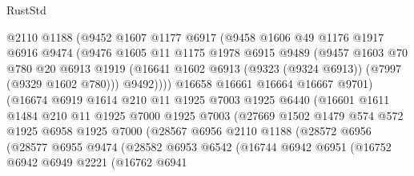 \begin{lexlean}{RustStd}
\begin{coremodule}
                    @2110
                    @1188
                    (@9452
                      @1607
                      @1177
                      @6917
                      (@9458
                        @1606
                        @49
                        @1176
                        @1917
                        @6916
                        @9474
                        (@9476
                          @1605
                          @11
                          @1175
                          @1978
                          @6915
                          @9489
                          (@9457
                            @1603
                            @70
                            @780
                            @20
                            @6913
                            @1919
                            (@16641 @1602 @6913 (@9323 (@9324 @6913)) (@7997 (@9329 @1602 @780)))
                            @9492))))
                    @16658
                    @16661
                    @16664
                    @16667
                    @9701)
                  (@16674
                    @6919
                    @1614
                    @210
                    @11
                    @1925
                    @7003
                    @1925
                    @6440
                    (@16601
                      @1611
                      @1484
                      @210
                      @11
                      @1925
                      @7000
                      @1925
                      @7003
                      (@27669
                        @1502
                        @1479
                        @574
                        @572
                        @1925
                        @6958
                        @1925
                        @7000
                        (@28567
                          @6956
                          @2110
                          @1188
                          (@28572
                            @6956
                            (@28577
                              @6955
                              @9474
                              (@28582
                                @6953
                                @6542
                                (@16744
                                  @6942
                                  @6951
                                  (@16752
                                    @6942
                                    @6949
                                    @2221
                                    (@16762
                                      @6941

\end{coremodule}
\end{lexlean}
